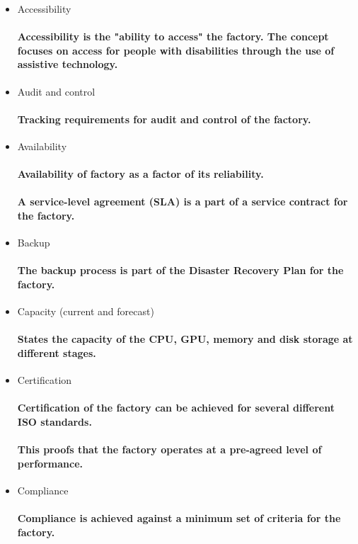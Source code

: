\begin{itemize} 
  \item Accessibility
  \paragraph{Accessibility is the "ability to access" the factory. The concept focuses on access for people with disabilities through the use of assistive technology.}
  \item Audit and control
  \paragraph{Tracking requirements for audit and control of the factory.}
  \item Availability
  \paragraph{Availability of factory as a factor of its reliability.}
  \paragraph{A service-level agreement (SLA) is a part of a service contract for the factory.}
  \item Backup
  \paragraph{The backup process is part of the Disaster Recovery Plan for the factory.}
  \item Capacity (current and forecast)
  \paragraph{States the capacity of the CPU, GPU, memory and disk storage at different stages.}
  \item Certification
  \paragraph{Certification of the factory can be achieved for several different ISO standards.}
  \paragraph{This proofs that the factory operates at a pre-agreed level of performance.}
  \item Compliance
  \paragraph{Compliance is achieved against a minimum set of criteria for the factory.}

\end{itemize}
